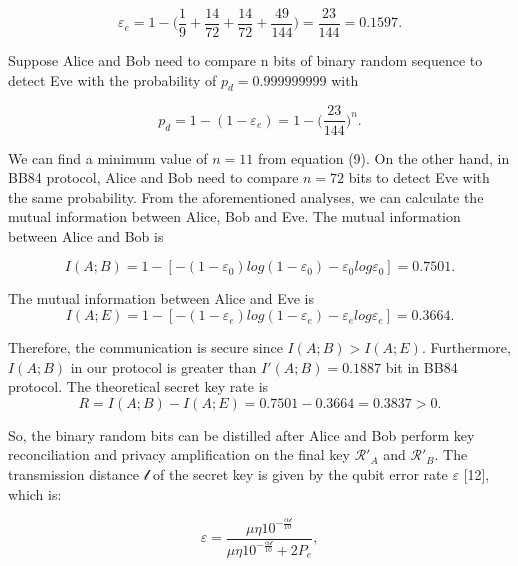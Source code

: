 \documentclass[a4paper,11pt]{article}
\begin{document}
\begin{equation*}
\varepsilon_e = 1 - \Big(\dfrac{1}{9} + \dfrac{14}{72} + \dfrac{14}{72} + \dfrac{49}{144} \Big) = \dfrac{23}{144} = 0.1597.
\end{equation*}

Suppose Alice and Bob need to compare n bits of binary random sequence to detect Eve with the probability of $p_d = 0.999999999$ with

\begin{equation*}
p_d = 1 - (1-\varepsilon_e) = 1 - \Big(\dfrac{23}{144} \Big)^n.
\end{equation*}

We can find a minimum value of $n = 11$ from equation (9). On the other hand, in BB84 protocol, Alice and Bob need to compare $n = 72$ bits to detect Eve with the same probability. From the aforementioned analyses, we can calculate the mutual information between Alice, Bob and Eve. The mutual information between Alice and Bob is

\begin{equation*}
I(A; B) = 1 - [-(1-\varepsilon_0)log(1-\varepsilon_0) - \varepsilon_0 log \varepsilon_0] = 0.7501.
\end{equation*}

The mutual information between Alice and Eve is 
\begin{equation*}
I(A; E) = 1 - [-(1-\varepsilon_e)log(1-\varepsilon_e) - \varepsilon_e log \varepsilon_e] = 0.3664.
\end{equation*}

Therefore, the communication is secure since $I(A; B) > I(A; E)$. Furthermore, $I(A; B)$ in our protocol is greater than $I' (A; B) = 0.1887$ bit in BB84 protocol.
The theoretical secret key rate is
\begin{equation*}
R = I(A; B) - I(A; E) = 0.7501 - 0.3664 = 0.3837 > 0.
\end{equation*}

So, the binary random bits can be distilled after Alice and Bob perform key reconciliation and privacy amplification on the final key $\mathcal{R}'_A$ and $\mathcal{R}'_B$. The transmission distance $\mathcal{l}$ of the secret key is given by the qubit error rate $\varepsilon$ [12], which is:

\begin{equation*}
\varepsilon = \dfrac{\mu \eta 10^{- \frac{\alpha \mathcal{l}}{10}}}{\mu \eta 10^{- \frac{\alpha \mathcal{l}}{10}} + 2P_e}, 
\end{equation*}
\end{document}
